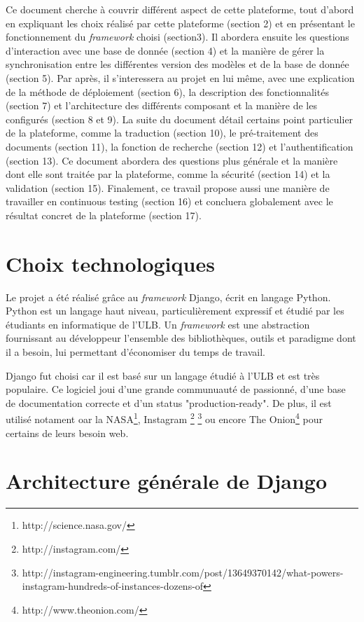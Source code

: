 \documentclass[a4paper,12pt]{article}
\begin{document}
Ce document cherche à couvrir différent aspect de cette plateforme, tout d'abord en
expliquant les choix réalisé par cette plateforme (section 2) et en présentant
le fonctionnement du \textit{framework} choisi (section3). Il abordera ensuite
les questions d'interaction avec une base de donnée (section 4) et la manière
de gérer la synchronisation entre les différentes version des modèles et de
la base de donnée (section 5). Par après, il s'interessera au projet en lui
même, avec une explication de la méthode de déploiement (section 6), la
description des fonctionnalités (section 7) et l'architecture des différents
composant et la manière de les configurés (section 8 et 9). La suite du
document détail certains point particulier de la plateforme, comme la traduction (section 10),
le pré-traitement des documents (section 11), la fonction de recherche (section 12)
et l'authentification (section 13). Ce document abordera des questions
plus générale et la manière dont elle sont traitée par la plateforme, comme la
sécurité (section 14) et la validation (section 15). Finalement, ce travail propose aussi
une manière de travailler en continuous testing (section 16) et concluera
globalement avec le résultat concret de la plateforme (section 17).


\section{Choix technologiques}

Le projet a été réalisé grâce au \textit{framework} Django, écrit en langage Python.
Python est un langage haut niveau, particulièrement expressif et étudié par
les étudiants en informatique de l'ULB. Un \textit{framework} est une abstraction
fournissant au développeur l'ensemble des bibliothèques, outils et paradigme
dont il a besoin, lui permettant d'économiser du temps de travail. 

Django fut choisi car il est basé sur un langage étudié à l'ULB et est très populaire.
Ce logiciel joui d'une grande communuauté de passionné, d'une base de documentation
correcte et d'un status "production-ready". De plus, il est utilisé notament
oar la NASA\footnote{http://science.nasa.gov/}, Instagram
\footnote{http://instagram.com/}
\footnote{http://instagram-engineering.tumblr.com/post/13649370142/what-powers-instagram-hundreds-of-instances-dozens-of}
ou encore The Onion\footnote{http://www.theonion.com/} pour certains de leurs besoin web.


\section{Architecture générale de Django}
\end{document}

